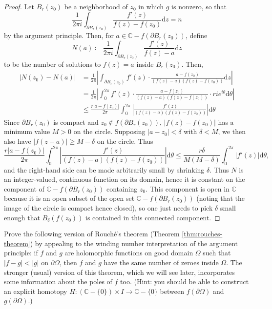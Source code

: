 \documentclass[10pt]{article}
\providecommand{\dd}{\mathrm d}
\providecommand{\CC}{\mathbb C}
\providecommand{\abs}[1]{\left\lvert{#1}\right\rvert}
\begin{document}
\begin{proof}
    Let $B_r(z_0)$ be a neighborhood of $z_0$ in which
    $g$ is nonzero, so that
    \begin{equation*}
	\frac 1{2\pi i}\int_{\partial B_r(z_0)} \frac{f'(z)}{f(z)-f(z_0)}\dd z
	= n
    \end{equation*}
    by the argument principle. Then, for $a\in\CC - f(\partial B_r(z_0))$,
    define
    \begin{equation*}
        N(a) \coloneq 
	\frac 1{2\pi i}\int_{\partial B_r(z_0)} \frac{f'(z)}{f(z)- a}\dd z
    \end{equation*}
    to be the number of solutions to $f(z) = a$ inside $B_r(z_0)$.
    Then,
    \begin{align*}
	\abs{N(z_0) - N(a)}
	&= \frac 1{2\pi}\abs{\int_{\partial B_r(z_0)}
	f'(z)\cdot\frac{a-f(z_0)}{(f(z)-a)(f(z)-f(z_0))}\dd z}\\
	&= \frac 1{2\pi}\abs{\int_{0}^{2\pi}f'(z)\cdot
	\frac{a-f(z_0)}{(f(z)-a)(f(z)-f(z_0))}\cdot rie^{i\theta}\dd\theta}\\
	&\le \frac{r\abs{a-f(z_0)}}{2\pi}\int_0^{2\pi}\abs{
	\frac{f'(z)}{(f(z)-a)(f(z)-f(z_0))}}\dd\theta
    \end{align*}
    Since $\partial B_r(z_0)$ is compact and $z_0\notin f(\partial B_r(z_0))$,
    $\abs{f(z)-f(z_0)}$ has a minimum value $M > 0$ on the circle.
    Supposing $\abs{a-z_0} < \delta$ with $\delta < M$,
    we then also have $\abs{f(z-a)} \ge M-\delta$ on the circle. Thus
    \begin{equation*}
	\frac{r\abs{a-f(z_0)}}{2\pi}\int_0^{2\pi}\abs{
	\frac{f'(z)}{(f(z)-a)(f(z)-f(z_0))}}\dd\theta
	\le \frac{r\delta}{M(M-\delta)}\int_0^{2\pi}\abs{f'(z)}\dd\theta,
    \end{equation*}
    and the right-hand side can be made arbitrarily small
    by shrinking $\delta$.
    Thus $N$ is an integer-valued, continuous function
    on its domain, hence it is constant on the component
    of $\CC - f(\partial B_r(z_0))$ containing $z_0$.
    This component is open in $\CC$ because
    it is an open subset of the open set $\CC - f(\partial B_r(z_0))$
    (noting that the image of the circle is compact hence closed),
    so one just needs to pick $\delta$ small enough
    that $B_\delta(f(z_0))$ is contained in this connected component.
\end{proof}

\begin{exercise}
    \label{exer:rouche-zeroes}
    Prove the following version of Rouch\'e's theorem
    (Theorem \ref{thm:rouches-theorem})
    by appealing to the winding number interpretation
    of the argument principle:
    if $f$ and $g$ are holomorphic functions on good domain $\Omega$
    such that $\abs{f-g} < \abs g$ on $\partial\Omega$,
    then $f$ and $g$ have the same number of zeroes inside $\Omega$.
    The stronger (usual) version of this theorem,
    which we will see later, incorporates some information
    about the poles of $f$ too.
    (Hint: you should be able to construct
    an explicit homotopy $H\colon(\CC-\{0\})\times I\to\CC-\{0\}$
    between $f(\partial\Omega)$ and $g(\partial\Omega)$.)
\end{exercise}
\end{document}
